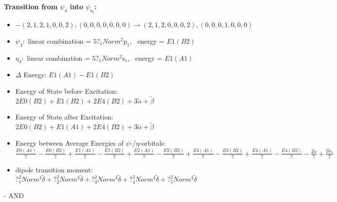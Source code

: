 \documentclass[12pt,a4paper]{article}
\begin{document}
        \noindent\textbf{Transition from $\psi_{4}$ into $\psi_{\text{s}_{4}}$:}
        \begin{itemize}
            \item $- (2, 1, 2, 1, 0, 0, 2), (0, 0, 0, 0, 0, 0, 0) \rightarrow (2, 1, 2, 0, 0, 0, 2), (0, 0, 0, 1, 0, 0, 0)$
        
            \item $\psi_{4}:$ linear combination = $5 ?_{1} Norm^{2} \text{p}_{1}$, \
            energy = $E1(B2)$
            
            \item $\eta_{4}:$ linear combination = $5 ?_{1} Norm^{2} \text{s}_{1}$, \
            energy = $E1(A1)$
            
                \item $\Delta$ Energy: $E1(A1) - E1(B2)$
                \item Energy of State before Excitation: $2 E0(B2) + E1(B2) + 2 E4(B2) + 3 \tilde{\alpha} + \tilde{\beta}$
                \item Energy of State after Excitation: $2 E0(B2) + E1(A1) + 2 E4(B2) + 3 \tilde{\alpha} + \tilde{\beta}$
                \item Energy between Average Energies of $\psi$-/$\eta$-orbitals: $\frac{E0(A1)}{7} - \frac{E0(B2)}{7} + \frac{E1(A1)}{7} - \frac{E1(B2)}{7} + \frac{E2(A1)}{7} - \frac{E2(B2)}{7} + \frac{E3(A1)}{7} - \frac{E3(B2)}{7} + \frac{E4(A1)}{7} - \frac{E4(B2)}{7} - \frac{2 \tilde{\alpha}}{7} + \frac{2 \tilde{\alpha}_{s}}{7}$
            
            \item dipole transition moment: $?_{1}^{2} Norm^{4} \tilde{\delta} + ?_{2}^{2} Norm^{4} \tilde{\delta} + ?_{3}^{2} Norm^{4} \tilde{\delta} + ?_{4}^{2} Norm^{4} \tilde{\delta} + ?_{5}^{2} Norm^{4} \tilde{\delta}$
        
        \end{itemize}
        
 -  AND 
\end{document}

